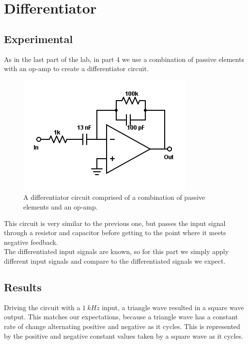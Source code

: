 \documentclass[11pt]{article}
\begin{document}
\section{Differentiator}
\subsection{Experimental}

As in the last part of the lab, in part 4 we use a combination of passive elements with an op-amp to create a differentiator circuit.

\begin{figure}[H]
    \centering
    \includegraphics[scale=0.5]{Diagrams/c-d.png}
    \caption{A differentiator circuit comprised of a combination of passive elements and an op-amp.}
    \label{circuit:d}
\end{figure}

This circuit is very similar to the previous one, but passes the input signal through a resistor and capacitor before getting to the point where it meets negative feedback.\\

The differentiated input signals are known, so for this part we simply apply different input signals and compare to the differentiated signals we expect.\\


\subsection{Results}

Driving the circuit with a $1\ kHz$ input, a triangle wave resulted in a square wave output. This matches our expectations, because a triangle wave has a constant rate of change alternating positive and negative as it cycles. This is represented by the positive and negative constant values taken by a square wave as it cycles.\\
\end{document}
